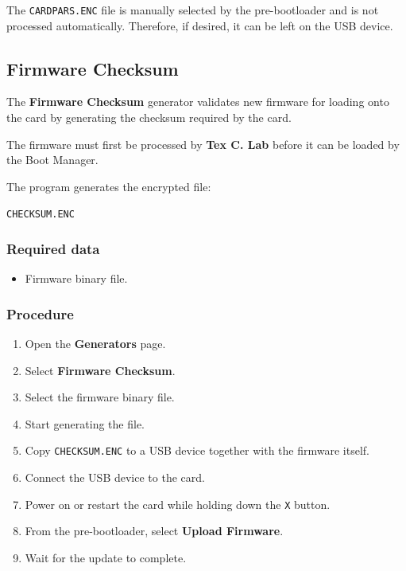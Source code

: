 ﻿\documentclass[11pt,a4paper]{article}
\newcommand{\software}{\textbf{Tex C. Lab}}
\newcommand{\button}[1]{\textbf{#1}}
\newcommand{\filename}[1]{\texttt{#1}}
\begin{document}
The \filename{CARDPARS.ENC} file is manually selected by the
pre-bootloader and is not processed automatically. Therefore,
if desired, it can be left on the USB device.

\subsection{Firmware Checksum}

The \button{Firmware Checksum} generator validates new firmware
for loading onto the card by generating the checksum required
by the card.

The firmware must first be processed by \software{}
before it can be loaded by the Boot Manager.

The program generates the encrypted file:

\begin{center}
    \filename{CHECKSUM.ENC}
\end{center}

\subsubsection*{Required data}

\begin{itemize}
    \item Firmware binary file.
\end{itemize}

\subsubsection*{Procedure}

\begin{enumerate}
    \item Open the \button{Generators} page.
    \item Select \button{Firmware Checksum}.
    \item Select the firmware binary file.
    \item Start generating the file.
    \item Copy \filename{CHECKSUM.ENC} to a USB device
    together with the firmware itself.
    \item Connect the USB device to the card.
    \item Power on or restart the card while holding down
    the \texttt{X} button.
    \item From the pre-bootloader, select
    \button{Upload Firmware}.
    \item Wait for the update to complete.
\end{enumerate}
\end{document}
